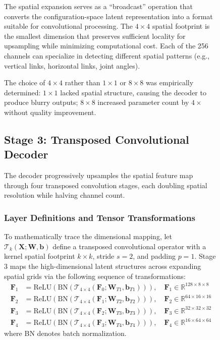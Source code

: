 \documentclass[12pt,a4paper,oneside]{report}
\begin{document}
\begin{figure}[H]
The spatial expansion serves as a ``broadcast'' operation that converts the configuration-space latent representation into a format suitable for convolutional processing. The $4 \times 4$ spatial footprint is the smallest dimension that preserves sufficient locality for upsampling while minimizing computational cost. Each of the 256 channels can specialize in detecting different spatial patterns (e.g., vertical links, horizontal links, joint angles).

The choice of $4 \times 4$ rather than $1 \times 1$ or $8 \times 8$ was empirically determined: $1 \times 1$ lacked spatial structure, causing the decoder to produce blurry outputs; $8 \times 8$ increased parameter count by $4\times$ without quality improvement.

\subsection{Stage 3: Transposed Convolutional Decoder}

The decoder progressively upsamples the spatial feature map through four transposed convolution stages, each doubling spatial resolution while halving channel count.

\subsubsection{Layer Definitions and Tensor Transformations}

To mathematically trace the dimensional mapping, let $\mathcal{T}_k(\mathbf{X}; \mathbf{W}, \mathbf{b})$ define a transposed convolutional operator with a kernel spatial footprint $k \times k$, stride $s=2$, and padding $p=1$. Stage 3 maps the high-dimensional latent structures across expanding spatial grids via the following sequence of transformations:
\begin{align}
\mathbf{F}_1 &= \text{ReLU}\left(\text{BN}\left(\mathcal{T}_{4\times4}(\mathbf{F}_0; \mathbf{W}_{T1}, \mathbf{b}_{T1})\right)\right), \quad \mathbf{F}_1 \in \mathbb{R}^{128 \times 8 \times 8} \\
\mathbf{F}_2 &= \text{ReLU}\left(\text{BN}\left(\mathcal{T}_{4\times4}(\mathbf{F}_1; \mathbf{W}_{T2}, \mathbf{b}_{T2})\right)\right), \quad \mathbf{F}_2 \in \mathbb{R}^{64 \times 16 \times 16} \\
\mathbf{F}_3 &= \text{ReLU}\left(\text{BN}\left(\mathcal{T}_{4\times4}(\mathbf{F}_2; \mathbf{W}_{T3}, \mathbf{b}_{T3})\right)\right), \quad \mathbf{F}_3 \in \mathbb{R}^{32 \times 32 \times 32} \\
\mathbf{F}_4 &= \text{ReLU}\left(\text{BN}\left(\mathcal{T}_{4\times4}(\mathbf{F}_3; \mathbf{W}_{T4}, \mathbf{b}_{T4})\right)\right), \quad \mathbf{F}_4 \in \mathbb{R}^{16 \times 64 \times 64}
\end{align}
where BN denotes batch normalization.


\end{figure}
\end{document}
